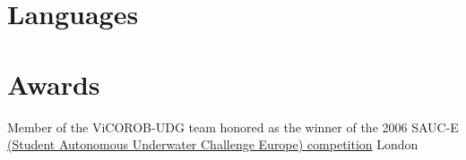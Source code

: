 \documentclass[11pt,a4paper,sans]{moderncv}
\begin{document}
\makecvtitle





\section{Languages}

%


\section{Awards}
{Member of the {ViCOROB-UDG} team honored as the winner of the 2006 {SAUC-E} \href{http://sauc-europe.org/about.html}{(Student Autonomous Underwater Challenge Europe) competition}}
{}
{}
{London}
{}
\end{document}
